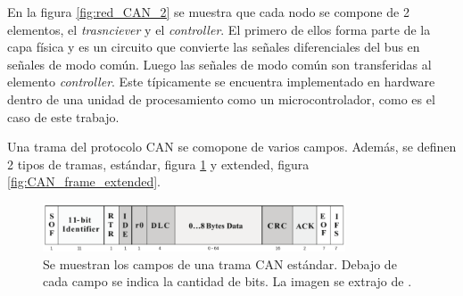 En la figura \ref{fig:red_CAN_2} se muestra que cada nodo se compone de 2 elementos, el \textit{trasnciever} y el \textit{controller}. El primero de ellos forma parte de la capa física y es un circuito que convierte las señales diferenciales del bus en señales de modo común. Luego las señales de modo común son transferidas al elemento \textit{controller}. Este típicamente se encuentra implementado en hardware dentro de una unidad de procesamiento como un microcontrolador, como es el caso de este trabajo.



Una trama del protocolo CAN se comopone de varios campos. Además, se definen 2 tipos de tramas, estándar, figura \ref{fig:CAN_frame_standard} y extended, figura \ref{fig:CAN_frame_extended}.

\begin{figure}[htb]
    \centering
    \includegraphics[width=0.8\textwidth]{img/CAN_frame_standard.png}
    \caption{Se muestran los campos de una trama CAN estándar. Debajo de cada campo se indica la cantidad de bits. La imagen se extrajo de \cite{texasSLOA101B}.}
    \label{fig:CAN_frame_standard}
\end{figure}

